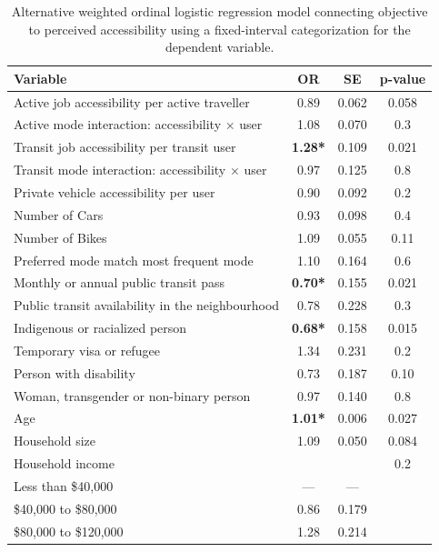 \documentclass[preprint, 3p,
authoryear]{elsarticle} %
\begin{document}
\begin{table}

\caption{\label{tab:unnamed-chunk-9}\label{tab:few_jobs_break_model}Alternative weighted ordinal logistic regression model connecting objective to perceived accessibility using a fixed-interval categorization for the dependent variable.}
\centering
\begin{tabular}[t]{lccc}
\toprule
\textbf{Variable} & \textbf{OR} & \textbf{SE} & \textbf{p-value}\\
\midrule
Active job accessibility per active traveller & 0.89 & 0.062 & 0.058\\
Active mode interaction: accessibility × user & 1.08 & 0.070 & 0.3\\
Transit job accessibility per transit user & \textbf{1.28*} & 0.109 & 0.021\\
Transit mode interaction: accessibility × user & 0.97 & 0.125 & 0.8\\
Private vehicle accessibility per user & 0.90 & 0.092 & 0.2\\
\addlinespace
Number of Cars & 0.93 & 0.098 & 0.4\\
Number of Bikes & 1.09 & 0.055 & 0.11\\
Preferred mode match most frequent mode & 1.10 & 0.164 & 0.6\\
Monthly or annual public transit pass & \textbf{0.70*} & 0.155 & 0.021\\
Public transit availability in the neighbourhood & 0.78 & 0.228 & 0.3\\
\addlinespace
Indigenous or racialized person & \textbf{0.68*} & 0.158 & 0.015\\
Temporary visa or refugee & 1.34 & 0.231 & 0.2\\
Person with disability & 0.73 & 0.187 & 0.10\\
Woman, transgender or non-binary person & 0.97 & 0.140 & 0.8\\
Age & \textbf{1.01*} & 0.006 & 0.027\\
\addlinespace
Household size & 1.09 & 0.050 & 0.084\\
Household income &  &  & 0.2\\
\hspace{1em}Less than \$40,000 & — & — & \\
\hspace{1em}\$40,000 to \$80,000 & 0.86 & 0.179 & \\
\hspace{1em}\$80,000 to \$120,000 & 1.28 & 0.214 & \\

\end{tabular}
\end{table}
\end{document}
